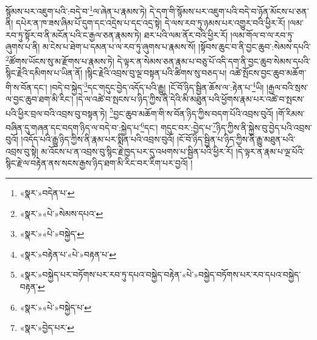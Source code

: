 སྙོམས་པར་འཇུག་པའི་:བདེ་བ་\footnote{«སྣར་»བདེན་པ་}ལ་ཞེན་པ་རྣམས་ཏེ། དེ་དག་གི་སྙོམས་པར་འཇུག་པའི་བདེ་བ་ཉོན་མོངས་པ་ཅན་ནི། དཔེར་ན་ཁ་ཟས་ཞིམ་པོ་དུག་དང་འདྲེས་པ་དང་འདྲ་སྟེ། དེ་ལས་རབ་ཏུ་ཉམས་པར་འགྱུར་བའི་ཕྱིར་རོ། །ལམ་རབ་ཏུ་སྟོར་བ་ནི་མངོན་པའི་ང་རྒྱལ་ཅན་རྣམས་ཏེ། ཐར་པའི་ལམ་ནོར་བའི་ཕྱིར་རོ། །ལམ་གོལ་བ་ལ་རབ་ཏུ་ཞུགས་པ་ནི། མ་ངེས་པ་ཐེག་པ་དམན་པ་ལ་རབ་ཏུ་ཞུགས་པ་རྣམས་སོ། །སྟོབས་ཆུང་བ་ནི་བྱང་ཆུབ་:སེམས་དཔའི་\footnote{«སྣར་»«པེ་»སེམས་དཔའ་}ཚོགས་ཡོངས་སུ་མ་རྫོགས་པ་རྣམས་ཏེ། དེ་ལྟར་ན་སེམས་ཅན་རྣམ་པ་བཅུ་པོ་འདི་དག་ནི་བྱང་ཆུབ་སེམས་དཔའི་སྙིང་རྗེའི་དམིགས་པ་ཡིན་ནོ། །སྙིང་རྗེའི་འབྲས་བུ་ལྔ་བསྟན་པའི་ཚིགས་སུ་བཅད་པ། འཚེ་སྤོངས་བྱང་ཆུབ་མཆོག་གི་ས་བོན་དང་། །བདེ་བ་སྐྱེད་\footnote{«སྣར་»«པེ་»བསྐྱེད་}དང་གདུང་བྱེད་འདོད་པའི་རྒྱུ། །ངོ་བོ་ཉིད་སྦྱིན་ཆོས་ལ་:རྟེན་པ་\footnote{«སྣར་»བརྟེན་པ་«པེ་»བརྟན་པ་}ཡི། །རྒྱལ་བའི་སྲས་ལ་བྱང་ཆུབ་ཐག་མི་རིང་། །དེ་ལ་འཚེ་བ་སྤངས་པ་ཉིད་ཀྱིས་ནི་དེའི་མི་མཐུན་པའི་ཕྱོགས་རྣམ་པར་འཚེ་བ་སྤངས་པའི་ཕྱིར་བྲལ་བའི་འབྲས་བུ་བསྟན་ཏེ། \footnote{«སྣར་»བསྐྱེད་པར་བཏོགས་པར་རབ་ཏུ་དཔའ་བསྐྱེད་བརྟེན་«པེ་»བསྐྱེད་བཏོགས་པར་རབ་དཔའ་བསྐྱེད་བརྟན་}བྱང་ཆུབ་མཆོག་གི་ས་བོན་ཉིད་ཀྱིས་བདག་པོའི་འབྲས་བུའོ། །གོ་རིམས་བཞིན་དུ་གཞན་དང་བདག་ཉིད་ལ་བདེ་བ་:སྐྱེད་པ་\footnote{«སྣར་»«པེ་»བསྐྱེད་པ་}དང་། གདུང་བར་:བྱེད་པ་\footnote{«སྣར་»བྱེད་པར་}ཉིད་ཀྱིས་ནི་སྐྱེས་བུ་བྱེད་པའི་འབྲས་བུའོ། །འདོད་པའི་རྒྱུ་ཉིད་ཀྱིས་ནི་རྣམ་པར་སྨིན་པའི་འབྲས་བུའོ། །ངོ་བོ་ཉིད་སྦྱིན་པ་ཉིད་ཀྱིས་ནི་རྒྱུ་མཐུན་པའི་འབྲས་བུ་སྟེ། མ་འོངས་པ་ན་འབྲས་བུ་སྙིང་རྗེ་ཁྱད་པར་དུ་འཕགས་པ་སྦྱིན་པའི་ཕྱིར་རོ། །དེ་ལྟར་ན་རྣམ་པ་ལྔ་པོའི་སྙིང་རྗེ་ལ་བརྟེན་ནས་སངས་རྒྱས་ཉིད་ཐག་མི་རིང་བར་རིག་པར་བྱའོ། །
